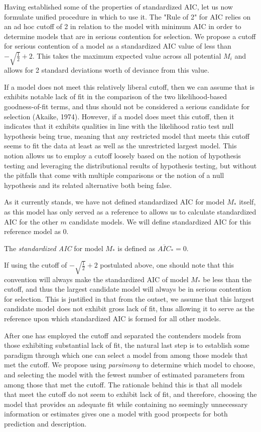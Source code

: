 		Having established some of the properties of standardized AIC, let us now formulate unified procedure in which to use it. The "Rule of 2" for AIC relies on an ad hoc cutoff of 2 in 
		relation to the model with minimum AIC in order to determine models that are in serious contention for selection. We propose a cutoff for serious contention of a model as a
		standardized AIC value of less than $-\sqrt{\frac{1}{2}} + 2$. This takes the maximum expected value across all potential $M_i$ and allows for 2 standard deviations worth of
		deviance from this value.
		
		If a model does not meet this relatively liberal cutoff, then we can assume that is exhibits notable lack of fit in the comparison of the two likelihood-based goodness-of-fit terms,
		and thus should not be considered a serious candidate for selection (Akaike, 1974). However, if a model does meet this cutoff, then it indicates that it exhibits qualities in line with the
		likelihood ratio test null hypothesis being true, meaning that any restricted model that meets this cutoff seems to fit the data at least as well as the unrestricted largest model.
		This notion allows us to employ a cutoff loosely based on the notion of hypothesis testing and leveraging the distributional results of hypothesis testing, but without the pitfalls
		that come with multiple comparisons or the notion of a null hypothesis and its related alternative both being false.

		As it currently stands, we have not defined standardized AIC for model $M_*$ itself, as this model has only served as a reference to allows us to calculate standardized AIC for the
		other $m$ candidate models. We will define standardized AIC for this reference model as $0$.
		\begin{definition}
			The \textit{standardized AIC} for model $M_*$ is defined as $\overline{AIC}_* = 0$.
		\end{definition}
		If using the cutoff of $-\sqrt{\frac{1}{2}} + 2$ postulated above, one should note that this convention will always make the standardized AIC of model $M_*$ be less than the
		cutoff, and thus the largest candidate model will always be in serious contention for selection. This is justified in that from the outset, we assume that this largest
		candidate model does not exhibit gross lack of fit, thus allowing it to serve as the reference upon which standardized AIC is formed for all other models.

		After one has employed the cutoff and separated the contenders models from those exhibiting substantial lack of fit, the natural last step is to establish some paradigm
		through which one can select a model from among those models that met the cutoff. We propose using \textit{parsimony} to determine which model to choose, and selecting
		the model with the fewest number of estimated parameters from among those that met the cutoff. The rationale behind this is that all models that meet the cutoff do
		not seem to exhibit lack of fit, and therefore, choosing the model that provides an adequate fit while containing no seemingly unnecessary information or estimates
		gives one a model with good prospects for both prediction and description.
		
